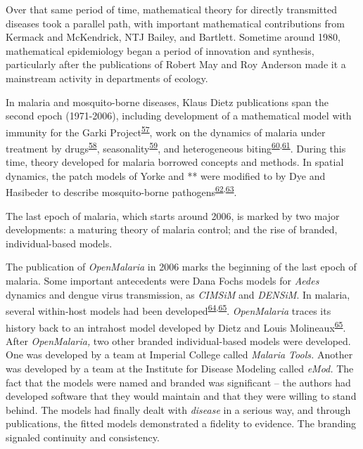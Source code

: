 \documentclass[
]{book}
\begin{document}
Over that same period of time, mathematical theory for directly transmitted diseases took a parallel path, with important mathematical contributions from Kermack and McKendrick, NTJ Bailey, and Bartlett. Sometime around 1980, mathematical epidemiology began a period of innovation and synthesis, particularly after the publications of Robert May and Roy Anderson made it a mainstream activity in departments of ecology.

In malaria and mosquito-borne diseases, Klaus Dietz publications span the second epoch (1971-2006), including development of a mathematical model with immunity for the Garki Project\textsuperscript{\protect\hyperlink{ref-DietzK1974GarkiModel}{57}}, work on the dynamics of malaria under treatment by drugs\textsuperscript{\protect\hyperlink{ref-DietzK1975ModelsParasitic}{58}}, seasonality\textsuperscript{\protect\hyperlink{ref-DietzK1976Seasonality}{59}}, and heterogeneous biting\textsuperscript{\protect\hyperlink{ref-DietzK1980ModelsVectorborne}{60},\protect\hyperlink{ref-DietzK1988EpidemiologicalModels}{61}}. During this time, theory developed for malaria borrowed concepts and methods. In spatial dynamics, the patch models of Yorke and ** were modified to by Dye and Hasibeder to describe mosquito-borne pathogens\textsuperscript{\protect\hyperlink{ref-DyeC1986PopulationDynamics}{62},\protect\hyperlink{ref-HasibederG1988PopulationDynamics}{63}}.

The last epoch of malaria, which starts around 2006, is marked by two major developments: a maturing theory of malaria control; and the rise of branded, individual-based models.

The publication of \emph{OpenMalaria} in 2006 marks the beginning of the last epoch of malaria. Some important antecedents were Dana Fochs models for \emph{Aedes} dynamics and dengue virus transmission, as \emph{CIMSiM} and \emph{DENSiM}. In malaria, several within-host models had been developed\textsuperscript{\protect\hyperlink{ref-MolineauxL1999ReviewIntrahost}{64},\protect\hyperlink{ref-MolineauxL2001PlasmodiumFalciparum}{65}}. \emph{OpenMalaria} traces its history back to an intrahost model developed by Dietz and Louis Molineaux\textsuperscript{\protect\hyperlink{ref-MolineauxL2001PlasmodiumFalciparum}{65}}. After \emph{OpenMalaria,} two other branded individual-based models were developed. One was developed by a team at Imperial College called \emph{Malaria Tools.} Another was developed by a team at the Institute for Disease Modeling called \emph{eMod.} The fact that the models were named and branded was significant -- the authors had developed software that they would maintain and that they were willing to stand behind. The models had finally dealt with \emph{disease} in a serious way, and through publications, the fitted models demonstrated a fidelity to evidence. The branding signaled continuity and consistency.
\end{document}
